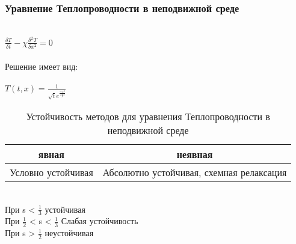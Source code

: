 \documentclass{article}
\begin{document}
\subsubsection{Уравнение Теплопроводности в неподвижной среде}\\
$\frac{\delta T}{\delta t} - \chi \frac{\delta^{2} T}{\delta x^{2}} = 0$\\\\
Решение имеет вид: \\\\
$T(t, x) = \frac{1}{\sqrt{t}e^{\frac{-x^{2}}{4\chi t}}}$
\begin{table}[h!]
    \centering
    \begin{tabular}{|c|c|}
        \hline
          явная & неявная \\
         \hline
         Условно устойчивая& Абсолютно устойчивая, схемная релаксация\\
         \hline
    \end{tabular}
    \caption{Устойчивость методов для уравнения Теплопроводности в неподвижной среде}
    \label{tab:my_label}
\end{table}\\
При s < $\frac{1}{3}$ устойчивая\\
При $\frac{1}{2}$ < s < $\frac{1}{3}$ Слабая устойчивость\\
При s > $\frac{1}{2}$ неустойчивая\\
\end{document}
